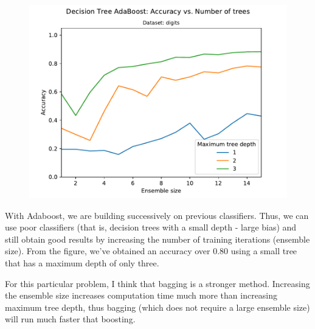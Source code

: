 \documentclass{article}
\begin{document}
\begin{figure}[h]
\centering
\includegraphics[scale=1]{boosted_tree_plot}
\end{figure}

With Adaboost, we are building successively on previous classifiers. Thus, we can use poor classifiers (that is, decision trees with a small depth - large bias) and still obtain good results by increasing the number of training iterations (ensemble size). From the figure, we've obtained an accuracy over 0.80 using a small tree that has a maximum depth of only three. 

For this particular problem, I think that bagging is a stronger method. Increasing the ensemble size increases computation time much more than increasing maximum tree depth, thus bagging (which does not require a large ensemble size) will run much faster that boosting.
\end{document}
